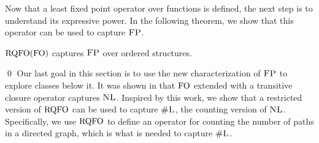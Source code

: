 Now that a least fixed point operator over functions is defined, the next step is to understand its expressive power.
In the following theorem, we show that this operator can be used to capture $\text{\sc FP}$.
\begin{thm} \label{rqfo-fo-cap}
	${\rm RQFO}({\rm FO})$ captures $\text{\sc FP}$ over ordered structures.
\end{thm}
\proof

\qed
Our last goal in this section is to use the new characterization of $\text{\sc FP}$ to explore classes below it.
It was shown in \cite{I86,I88} that ${\rm FO}$ extended with a transitive closure operator captures $\text{\sc NL}$. 
Inspired by this work, we show that a restricted version of ${\rm RQFO}$ can be used to capture $\text{\sc \#L}$, the counting version of $\text{\sc NL}$. 
Specifically, we use ${\rm RQFO}$ to define an operator for counting the number of paths in a directed graph, which is what is needed to capture $\text{\sc \#L}$.

